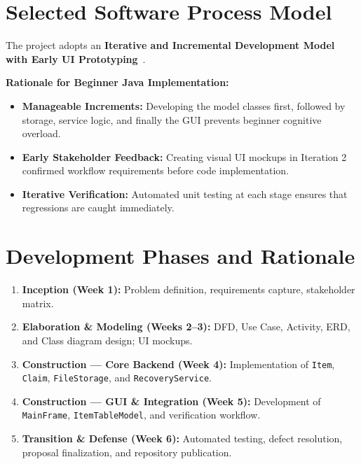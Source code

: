 \documentclass[11pt,a4paper]{article}
\begin{document}
\section{Selected Software Process Model}
The project adopts an \textbf{Iterative and Incremental Development Model with Early UI Prototyping}~\cite{sommerville2016, pressman2014}. 

\textbf{Rationale for Beginner Java Implementation:}
\begin{itemize}
    \item \textbf{Manageable Increments:} Developing the model classes first, followed by storage, service logic, and finally the GUI prevents beginner cognitive overload.
    \item \textbf{Early Stakeholder Feedback:} Creating visual UI mockups in Iteration 2 confirmed workflow requirements before code implementation.
    \item \textbf{Iterative Verification:} Automated unit testing at each stage ensures that regressions are caught immediately.
\end{itemize}

\section{Development Phases and Rationale}
\begin{enumerate}
    \item \textbf{Inception (Week 1):} Problem definition, requirements capture, stakeholder matrix.
    \item \textbf{Elaboration \& Modeling (Weeks 2--3):} DFD, Use Case, Activity, ERD, and Class diagram design; UI mockups.
    \item \textbf{Construction — Core Backend (Week 4):} Implementation of \texttt{Item}, \texttt{Claim}, \texttt{FileStorage}, and \texttt{RecoveryService}.
    \item \textbf{Construction — GUI \& Integration (Week 5):} Development of \texttt{MainFrame}, \texttt{ItemTableModel}, and verification workflow.
    \item \textbf{Transition \& Defense (Week 6):} Automated testing, defect resolution, proposal finalization, and repository publication.
\end{enumerate}

\end{document}
